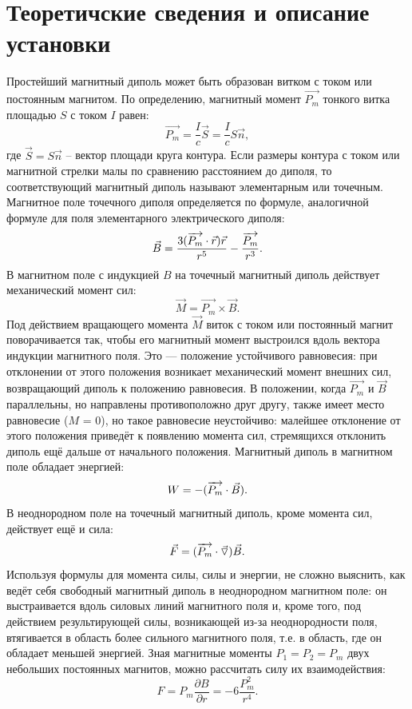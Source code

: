 	\section*{Теоретичские сведения и описание установки}
	Простейший магнитный диполь может быть образован витком с током или постоянным магнитом. По определению, магнитный момент $\overrightarrow{P_m}$ тонкого витка площадью $S$ с током $I$ равен:
$$
\overrightarrow{P_m}=\dfrac{I}{c}\vec{S}=\dfrac{I}{c}S\vec{n},
$$
где $\vec{S}=S\vec{n}$ -- вектор площади круга контура. Если размеры контура с током или магнитной стрелки малы по сравнению расстоянием до диполя, то соответствующий магнитный диполь называют элементарным или точечным.\\
Магнитное поле точечного диполя определяется по формуле, аналогичной формуле для поля
элементарного электрического диполя:
$$
\vec{B}=\dfrac{3(\overrightarrow{P_m} \cdot \vec{r})\vec{r}}{r^5} - \dfrac{\overrightarrow{P_m}}{r^3}.
$$ 
В магнитном поле с индукцией $B$
на точечный магнитный диполь 
действует механический
момент сил:
$$
\vec{M} = \overrightarrow{P_m}\times \vec{B}.
$$
Под действием вращающего момента $\vec{M}$ виток с током или постоянный магнит поворачивается
так, чтобы его магнитный момент выстроился вдоль вектора индукции магнитного поля. Это —
положение устойчивого равновесия: при отклонении от этого положения возникает механический
момент внешних сил, возвращающий диполь к положению равновесия. В положении, когда $\overrightarrow{P_m}$ и $\vec{B}$
параллельны, но направлены противоположно друг другу, также имеет место равновесие ($M$ = 0),
но такое равновесие неустойчиво: малейшее отклонение от этого положения приведёт к появлению
момента сил, стремящихся отклонить диполь ещё дальше от начального положения.\n\n
Магнитный диполь в магнитном поле обладает энергией:
$$
W = -(\overrightarrow{P_m} \cdot \vec{B}).
$$
В неоднородном поле на точечный магнитный диполь, кроме момента сил, действует ещё и сила:
$$
\vec{F}=(\overrightarrow{P_m} \cdot \vec{\triangledown})\vec{B}.
$$
Используя формулы для момента силы, силы и энергии, не сложно выяснить, как ведёт себя
свободный магнитный диполь в неоднородном магнитном поле: он выстраивается вдоль силовых
линий магнитного поля и, кроме того, под действием результирующей силы, возникающей из-за
неоднородности поля, втягивается в область более сильного магнитного поля, т.е. в область, где он
обладает меньшей энергией.\n\n
Зная магнитные моменты $P_1 = P_2 = P_m$ двух небольших постоянных магнитов, можно рассчитать силу
их взаимодействия:
$$
F = P_m \dfrac{\partial B}{\partial r}=-6\dfrac{P_m^2}{r^4}.
$$
